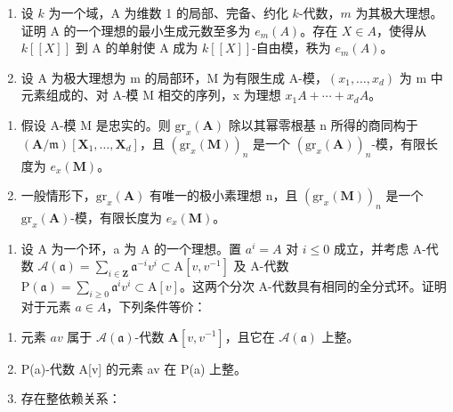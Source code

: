 \begin{enumerate}
\def\labelenumi{\arabic{enumi})}
\setcounter{enumi}{5}
\item
  设 \(k\) 为一个域，A 为维数 1 的局部、完备、约化 \(k\)-代数，\(m\) 为其极大理想。证明 A 的一个理想的最小生成元数至多为 \(e_m(A)\)。存在 \(X \in A\)，使得从 \(k[[X]]\) 到 A 的单射使 A 成为 \(k[[X]]\)-自由模，秩为 \(e_m(A)\)。
\item
  设 A 为极大理想为 m 的局部环，M 为有限生成 A-模，\((x_{1}, \ldots, x_{d})\) 为 m 中元素组成的、对 A-模 M 相交的序列，x 为理想 \(x_{1}A + \cdots + x_{d}A\)。
\end{enumerate}

\begin{enumerate}
\def\labelenumi{\alph{enumi})}
\tightlist
\item
  假设 A-模 M 是忠实的。则 \(\mathrm{gr}_{x}(\mathbf{A})\) 除以其幂零根基 n 所得的商同构于 \((\mathbf{A}/\mathfrak{m})[\mathbf{X}_{1}, \ldots, \mathbf{X}_{d}]\)，且 \((\mathrm{gr}_{x}(\mathbf{M}))_{n}\) 是一个 \((\mathrm{gr}_{x}(\mathbf{A}))_{n}\)-模，有限长度为 \(e_{x}(\mathbf{M})\)。
\item
  一般情形下，\(\mathrm{gr}_{x}(\mathbf{A})\) 有唯一的极小素理想 n，且 \((\mathrm{gr}_{x}(\mathbf{M}))_{n}\) 是一个 \(\mathrm{gr}_{x}(\mathbf{A})\)-模，有限长度为 \(e_{x}(\mathbf{M})\)。
\end{enumerate}

\begin{enumerate}
\def\labelenumi{\arabic{enumi})}
\setcounter{enumi}{7}
\tightlist
\item
  设 A 为一个环，a 为 A 的一个理想。置 \(a^{i} = A\) 对 \(i \leqslant 0\) 成立，并考虑 A-代数 \(\mathcal{A}(\mathfrak{a}) = \sum_{i \in \mathbf{Z}} \mathfrak{a}^{-i} v^{i} \subset \mathrm{A}[v, v^{-1}]\) 及 A-代数 \(\mathrm{P}(\mathfrak{a}) = \sum_{i \geqslant 0} \mathfrak{a}^{i} v^{i} \subset \mathrm{A}[v]\)。这两个分次 A-代数具有相同的全分式环。证明对于元素 \(a \in A\)，下列条件等价：
\end{enumerate}

\begin{enumerate}
\def\labelenumi{(\roman{enumi})}
\item
  元素 \(av\) 属于 \(\mathcal{A}(\mathfrak{a})\)-代数 \(\mathbf{A}[v, v^{-1}]\)，且它在 \(\mathcal{A}(\mathfrak{a})\) 上整。
\item
  P(a)-代数 A{[}v{]} 的元素 av 在 P(a) 上整。
\item
  存在整依赖关系：
\end{enumerate}

